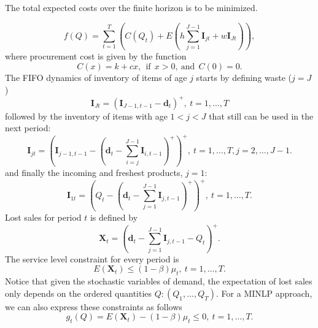 \smallskip\noindent
The total expected costs over the finite horizon is to be minimized.

\begin{equation}
\label{eq:objICCSA}
f(Q)=\sum_{t=1}^T \left(C(Q_t) + E\left(h\sum_{j=1}^{J-1} \boldsymbol{I}_{jt}  +w\boldsymbol{I}_{Jt}\right)\right),
\end{equation}
where procurement cost is given by the function
\begin{equation}
\label{eq:procICCSA}
C(x) = k+cx, \ \ \text{if} \ \ x>0,\ \text{and}\ \ C(0)=0 .
\end{equation}
%
The FIFO dynamics of inventory of items of  age $j$ starts by defining waste ($j=J$)
\begin{equation}
\label{eq:invWasteICCSA}
\boldsymbol{I}_{Jt}=(\boldsymbol{I}_{J-1,t-1} - \boldsymbol{d}_t)^+, \ t=1,\ldots,T
\end{equation}
followed by the inventory of items with age $1<j<J$ that still can be used in the next period:
\begin{equation}
\label{eq:inv2ICCSA}
\boldsymbol{I}_{jt}= \left(\boldsymbol{I}_{j-1,t-1} - (\boldsymbol{d}_t-\sum_{i=j}^{J-1}\boldsymbol{I}_{i,t-1})^+\right)^+, \ t=1,\ldots,T, j=2,\ldots,J-1 .
\end{equation}
%
and finally the incoming and freshest products, $j=1$:
%
\begin{equation}
\label{eq:inv1ICCSA}
\boldsymbol{I}_{1t}= \left(Q_t - (\boldsymbol{d}_t-\sum_{j=1}^{J-1}\boldsymbol{I}_{j,t-1})^+\right)^+, \ t=1,\ldots,T.
\end{equation}
%
Lost sales for period $t$ is defined by
%
\begin{equation}
\label{eq:lostsalesICCSA}
\boldsymbol{X}_t=\left(\boldsymbol{d}_t-\sum_{j=1}^{J-1}\boldsymbol{I}_{j,t-1}-Q_t\right)^+.
\end{equation}
%
The service level constraint for every period is
\begin{equation}
\label{eq:chanceICCSA}
E \left(\boldsymbol{X}_t\right) \le (1-\beta) \mu_t, \ t=1,\ldots,T.
\end{equation}
%
Notice that given the stochastic variables of demand, the expectation of lost sales only depends on the ordered quantities $Q: (Q_1,\ldots, Q_T)$. For a MINLP approach, we can also express these constraints as follows
%
\begin{equation}
\label{eq:defg}
g_t(Q)=E \left(\boldsymbol{X}_t\right) - (1-\beta)\mu_t\le 0,\ t=1,\ldots,T.
\end{equation}
